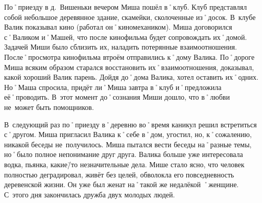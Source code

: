 По˚приезду в д.~Вишеньки вечером Миша пошёл в˚клуб. Клуб представлял собой небольшое деревянное здание, скамейки, сколоченные из˚досок. В~клубе Валик показывал кино (работал он˚киномехаником). Миша договорился с˚Валиком и˚Машей, что после кинофильма будет сопровождать их˚домой. Задачей Миши было сблизить их, наладить потерянные взаимоотношения. После˚просмотра кинофильма втроём отправились к˚дому Валика. По˚дороге Миша всяким образом старался восстановить их˚взаимоотношения, доказывал, какой хороший Валик парень. Дойдя до˚дома Валика, хотел оставить их˚одних. Но˚Маша спросила, придёт ли˚Миша завтра в˚клуб и˚предложила её˚проводить. В~этот момент до˚сознания Миши дошло, что в˚любви не~может быть помощников.

В~следующий раз по˚приезду в˚деревню во˚время каникул решил встретиться с˚другом. Миша пригласил Валика к˚себе в˚дом, угостил, но, к˚сожалению, никакой беседы не~получилось. Миша пытался вести беседы на˚разные темы, но˚было полное непонимание друг друга. Валика больше уже интересовала водка, пьянка, какие\=/то незначительные дела. Мише стало ясно, что человек полностью деградировал, живёт без целей, обволокла его повседневность деревенской жизни. Он уже был женат на˚такой же недалёкой ˚женщине. С~этого дня закончилась дружба двух молодых людей.
